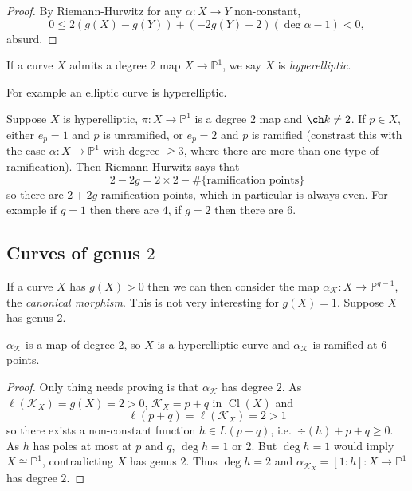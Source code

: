 \documentclass[a4paper]{article}
\DeclareMathOperator{\Cl}{Cl}
\renewcommand*{\P}{\mathbb{P}}
\begin{document}
\begin{proof}
  By Riemann-Hurwitz for any \(\alpha: X \to Y\) non-constant,
  \[
    0 \leq 2(g(X) - g(Y)) + (-2g(Y) + 2)(\deg \alpha - 1) < 0,
  \]
  absurd.
\end{proof}

\begin{definition}[hyperelliptic]
  If a curve \(X\) admits a degree \(2\) map \(X \to \P^1\), we say \(X\) is \emph{hyperelliptic}.
\end{definition}
For example an elliptic curve is hyperelliptic.

Suppose \(X\) is hyperelliptic, \(\pi: X \to \P^1\) is a degree \(2\) map and \(\ch k \neq 2\). If \(p \in X\), either \(e_p = 1\) and \(p\) is unramified, or \(e_p = 2\) and \(p\) is ramified (constrast this with the case \(\alpha: X \to \P^1\) with degree \(\geq 3\), where there are more than one type of ramification). Then Riemann-Hurwitz says that
\[
  2 - 2g = 2 \times 2 - \#\{\text{ramification points}\}
\]
so there are \(2 + 2g\) ramification points, which in particular is always even. For example if \(g = 1\) then there are \(4\), if \(g = 2\) then there are \(6\).

\subsection{Curves of genus \(2\)}

If a curve \(X\) has \(g(X) > 0\) then we can then consider the map \(\alpha_{\mathcal K}: X \to \P^{g - 1}\), the \emph{canonical morphism}. This is not very interesting for \(g(X) = 1\). Suppose \(X\) has genus \(2\).

\begin{proposition}
  \(\alpha_{\mathcal K}\) is a map of degree \(2\), so \(X\) is a hyperelliptic curve and \(\alpha_{\mathcal K}\) is ramified at \(6\) points.
\end{proposition}

\begin{proof}
  Only thing needs proving is that \(\alpha_{\mathcal K}\) has degree \(2\). As \(\ell(\mathcal K_X) = g(X) = 2 > 0\), \(\mathcal K_X = p + q\) in \(\Cl(X)\) and
  \[
    \ell(p + q) = \ell(\mathcal K_X) = 2 > 1
  \]
  so there exists a non-constant function \(h \in L(p + q)\), i.e.\ \(\div (h) + p + q \geq 0\). As \(h\) has poles at most at \(p\) and \(q\), \(\deg h = 1\) or \(2\). But \(\deg h = 1\) would imply \(X \cong \P^1\), contradicting \(X\) has genus \(2\). Thus \(\deg h = 2\) and \(\alpha_{\mathcal K_X} = [1:h]: X \to \P^1\) has degree \(2\).
\end{proof}
\end{document}
